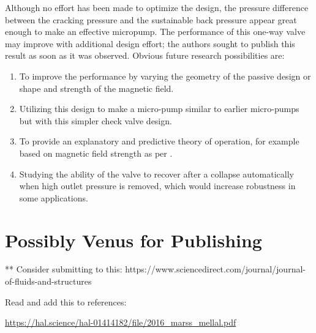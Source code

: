 \documentclass[]{asme2ej}
\begin{document}
Although no effort has been made to optimize the design, the pressure
difference between the cracking pressure and the sustainable back
pressure appear great enough to make an effective micropump. The
performance of this one-way valve may improve with additional design
effort; the authors sought to publish this result as soon as it was
observed.  Obvious future research possibilities are:
\begin{enumerate}
\item  To improve the
performance by varying the geometry of the passive design or shape and
strength of the magnetic field.
\item Utilizing this design to make a micro-pump
similar to earlier micro-pumps but with this simpler check valve
design.
\item To provide an explanatory and predictive theory of operation,
for example based on magnetic field strength as per \cite{ando2009ferrofluidic}.
\item Studying the ability of the valve to recover after
  a collapse automatically when high outlet pressure is removed,
  which would increase robustness in some applications.
\end{enumerate}

\section{Possibly Venus for Publishing}


** Consider submitting to this: https://www.sciencedirect.com/journal/journal-of-fluids-and-structures


Read and add this to references:

\url{https://hal.science/hal-01414182/file/2016_marss_mellal.pdf}


%




\end{document}
